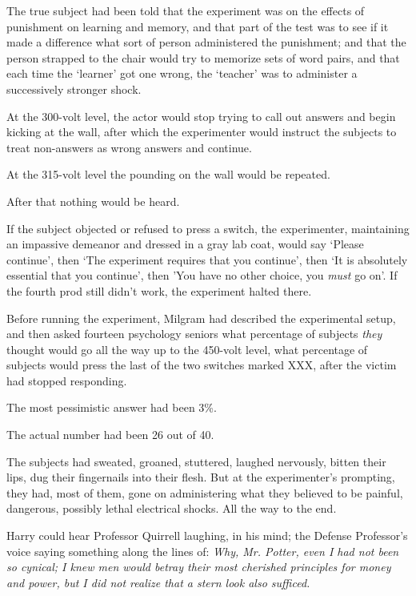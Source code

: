 The true subject had been told that the experiment was on the effects of punishment on learning and memory, and that part of the test was to see if it made a difference what sort of person administered the punishment; and that the person strapped to the chair would try to memorize sets of word pairs, and that each time the `learner' got one wrong, the `teacher' was to administer a successively stronger shock.

At the 300-volt level, the actor would stop trying to call out answers and begin kicking at the wall, after which the experimenter would instruct the subjects to treat non-answers as wrong answers and continue.

At the 315-volt level the pounding on the wall would be repeated.

After that nothing would be heard.

If the subject objected or refused to press a switch, the experimenter, maintaining an impassive demeanor and dressed in a gray lab coat, would say `Please continue', then `The experiment requires that you continue', then `It is absolutely essential that you continue', then 'You have no other choice, you \emph{must} go on'. If the fourth prod still didn't work, the experiment halted there.

Before running the experiment, Milgram had described the experimental setup, and then asked fourteen psychology seniors what percentage of subjects \emph{they} thought would go all the way up to the 450-volt level, what percentage of subjects would press the last of the two switches marked XXX, after the victim had stopped responding.

The most pessimistic answer had been 3\%.

The actual number had been 26 out of 40.

The subjects had sweated, groaned, stuttered, laughed nervously, bitten their lips, dug their fingernails into their flesh. But at the experimenter's prompting, they had, most of them, gone on administering what they believed to be painful, dangerous, possibly lethal electrical shocks. All the way to the end.

Harry could hear Professor Quirrell laughing, in his mind; the Defense Professor's voice saying something along the lines of: \emph{Why, Mr. Potter, even I had not been so cynical; I knew men would betray their most cherished principles for money and power, but I did not realize that a stern look also sufficed.}

